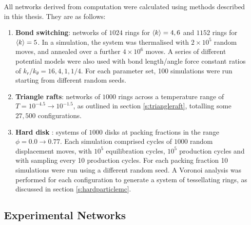 All networks derived from computation were calculated using methods described in this thesis.
They are as follows:
\begin{enumerate}
	\item \textbf{Bond switching}: networks of $1024$ rings for $\langle k \rangle=4,6$ and $1152$ rings for $\langle k \rangle=5$. 
	In a simulation, the system was thermalised with $2\times 10^5$ random moves, and annealed over a further $4\times 10^6$ moves. 
	A series of different potential models were also used with bond length/angle force constant ratios of $k_r/k_\theta=16,4,1,1/4$. 
	For each parameter set, 100 simulations were run starting from different random seeds.
	\item \textbf{Triangle rafts}: networks of $1000$ rings across a temperature range of $T=10^{-4.5}\rightarrow10^{-1.5}$, as outlined in section \ref{s:triangleraft}, totalling some $27,500$ configurations.  
	\item \textbf{Hard disk \mc}: systems of $1000$ disks at packing fractions in the range $\phi=0.0\rightarrow0.77$.
	Each simulation comprised cycles of $1000$ random displacement moves, with $10^5$ equilibration cycles, $10^5$ production cycles and with sampling every 10 production cycles. 
	For each packing fraction 10 simulations were run using a different random seed.
	 A Voronoi analysis was performed for each configuration to generate a system of tessellating rings, as discussed in section \ref{s:hardparticlemc}.
\end{enumerate} 

\subsection{Experimental Networks}

